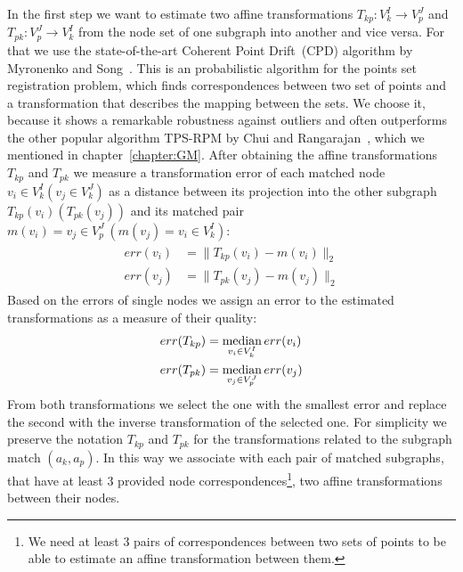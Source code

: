 In the first step we want to estimate two affine transformations $T_{kp}:V^I_k\rightarrow V^J_p$ and $T_{pk}:V^J_p\rightarrow V^I_k$ from the node set of one subgraph into another and vice versa. For that we use the state-of-the-art Coherent Point Drift~(CPD) algorithm by Myronenko and Song~\cite{Myronenko2009_CPD}. This is an probabilistic algorithm for the points set registration problem, which finds correspondences between two set of points and a transformation that describes the mapping between the sets. We choose it, because it shows a remarkable robustness against outliers and often outperforms the other popular algorithm TPS-RPM by Chui and Rangarajan~\cite{Chui2003}, which we mentioned in chapter~\ref{chapter:GM}. After obtaining the affine transformations $T_{kp}$ and $T_{pk}$ we measure a transformation error of each matched node $v_i\in V^I_k (v_j\in V^J_k)$ as a distance between its projection into the other subgraph $T_{kp}(v_i) (T_{pk}(v_j))$ and its matched pair $m(v_i) = v_j\in V^J_p\ (m(v_j) = v_i\in V^I_k)$:
\begin{align}\begin{split} \label{eq:err_v}
err(v_i) &= \|T_{kp}(v_i) - m(v_i)\|_{2}\\
err(v_j) &= \|T_{pk}(v_j) - m(v_j)\|_{2}
\end{split}\end{align}
Based on the errors of single nodes we assign an error to the estimated transformations as a measure of their quality:
\begin{equation}\begin{split} \label{eq:err_T}
err(T_{kp}) & = \mathop{\rm median}_{v_i\in V^I_k}err(v_i) \\
err(T_{pk}) & = \mathop{\rm median}_{v_j\in V^J_p}err(v_j)
\end{split}\end{equation}
From both transformations we select the one with the smallest error and replace the second with the inverse transformation of the selected one. For simplicity we preserve the notation $T_{kp}$ and $T_{pk}$ for the transformations related to the subgraph match $(a_k, a_p)$. In this way we associate with each pair of matched subgraphs, that have at least $3$ provided node correspondences\footnote{We need at least $3$ pairs of correspondences between two sets of points to be able to estimate an affine transformation between them.}, two affine transformations between their nodes.


